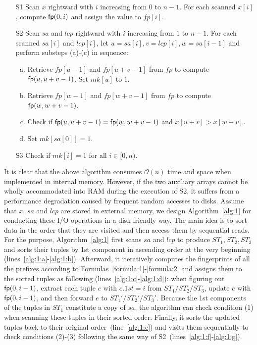 \documentclass[10pt,journal,compsoc]{IEEEtran}
\begin{document}
\begin{enumerate}
	\item [S1]
	Scan $x$ rightward with $i$ increasing from $0$ to $n - 1$. For each scanned $x[i]$, compute ${\sf fp}(0, i)$ and assign the value to $fp[i]$.
	
	\item [S2]
	Scan $sa$ and $lcp$ rightward with $i$ increasing from $1$ to $n - 1$. For each scanned $sa[i]$ and $lcp[i]$, let $u = sa[i], v = lcp[i], w = sa[i - 1]$ and perform substeps (a)-(c) in sequence:
	
	\begin{enumerate}[(a)]
		\item
		Retrieve $fp[u - 1]$ and $fp[u + v - 1]$ from $fp$ to compute ${\sf fp}(u, u + v - 1)$. Set $mk[u]$ to $1$.
		
		\item
		Retrieve $fp[w - 1]$ and $fp[w + v - 1]$ from $fp$ to compute ${\sf fp}(w, w + v - 1)$.
		
		\item
		Check if ${\sf fp}(u, u + v - 1) = {\sf fp}(w, w + v - 1)$ and $x[u + v] > x[w + v]$.
		
		\item
		Set $mk[sa[0]] = 1$.
	\end{enumerate}

	\item [S3] Check if $mk[i] = 1$ for all $i \in [0, n)$.
	
\end{enumerate}

It is clear that the above algorithm consumes $\mathcal{O}(n)$ time and space when implemented in internal memory. However, if the two auxiliary arrays cannot be wholly accommodated into RAM during the execution of S2, it suffers from a performance degradation caused by frequent random accesses to disks. Assume that $x$, $sa$ and $lcp$ are stored in external memory, we design Algorithm~\ref{alg:1} for conducting these I/O operations in a disk-friendly way. The main idea is to sort data in the order that they are visited and then access them by sequential reads. For the purpose, Algorithm~\ref{alg:1} first scans $sa$ and $lcp$ to produce $ST_1, ST_2, ST_3$ and sorts their tuples by 1st component in ascending order at the very beginning (lines~\ref{alg:1:a}-\ref{alg:1:b}). Afterward, it iteratively computes the fingerprints of all the prefixes according to Formulas~\ref{formula:1}-\ref{formula:2} and assigns them to the sorted tuples as following (lines~\ref{alg:1:c}-\ref{alg:1:d}): when figuring out ${\sf fp}(0, i - 1)$, extract each tuple $e$ with $e.1st = i$ from $ST_1/ST_2/ST_3$, update $e$  with ${\sf fp}(0, i - 1)$, and then forward $e$ to $ST_1'/ST_2'/ST_3'$. Because the 1st components of the tuples in $ST_1$ constitute a copy of $sa$, the algorithm can check condition (1) when scanning these tuples in their sorted order. Finally, it sorts the updated tuples back to their original order~(line~\ref{alg:1:e}) and visits them  sequentially to check conditions (2)-(3) following the same way of S2~(lines~\ref{alg:1:f}-\ref{alg:1:g}).  
\end{document}
